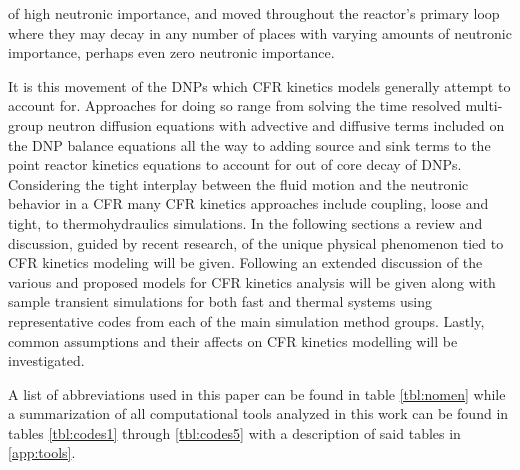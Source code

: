\documentclass[review]{elsarticle}
\begin{document}
of high neutronic importance, and moved throughout the reactor's primary loop
where they may decay in any number of places with varying amounts of
neutronic importance, perhaps even zero neutronic importance. 
\par It is this movement of the DNPs which CFR kinetics models generally
attempt to account for. Approaches for doing so range from solving the 
time resolved multi-group neutron diffusion equations with advective and
diffusive terms included on the DNP balance equations all the way to adding
source and sink terms to the point reactor kinetics equations to account
for out of core decay of DNPs. Considering the tight interplay between the
fluid motion and the neutronic behavior in a CFR many CFR kinetics approaches
include coupling, loose and tight, to thermohydraulics simulations. In the
following sections a review and discussion, guided by recent research, of the
unique physical phenomenon tied to CFR kinetics modeling will be given. 
Following an extended discussion of the various and proposed models for CFR
kinetics analysis will be given along with sample transient simulations for
both fast and thermal systems using representative codes from each of the main
simulation method groups. Lastly, common assumptions and their affects on CFR
kinetics modelling will be investigated.
\par A list of abbreviations used in this paper can be found in table
\ref{tbl:nomen} while a summarization of all computational tools analyzed
in this work can be found in tables \ref{tbl:codes1} through \ref{tbl:codes5}
 with a description of said
tables in \ref{app:tools}.
\end{document}
